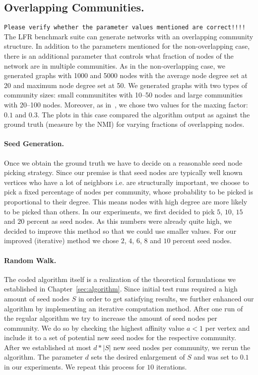 \subsection{Overlapping Communities.}
\texttt{Please verify whether the parameter values mentioned are correct!!!!}
The LFR benchmark suite can generate networks with an overlapping community structure. 
In addition to the parameters mentioned for the non-overlapping case, there is an additional 
parameter that controls what fraction of nodes of the network are in multiple communities. 
As in the non-overlapping case, we generated graphs with 1000 and 5000 nodes with the average
node degree set at 20 and maximum node degree set at 50. We generated graphs with two types 
of community sizes: small communitites with 10--50 nodes and large communities with 20--100 nodes.
Moreover, as in~\cite{LF09}, we chose two values for the maxing factor: $0.1$ and $0.3$. 
The plots in this case compared the algorithm output as against the ground truth (measure by 
the NMI) for varying fractions of overlapping nodes. 

\paragraph{Seed Generation.}
Once we obtain the ground truth we have to decide on a reasonable seed node 
picking strategy. Since our premise is that seed nodes are typically well known vertices 
who have a lot of neighbors i.e. are structurally important, we choose to pick a fixed 
percentage of nodes per community, whose probability to be picked is proportional to their degree. 
This means nodes with high degree are more likely to be picked than others. In our experiments, 
we first decided to pick $5$, $10$, $15$ and $20$ percent as seed nodes. As this numbers were 
already quite high, we decided to improve this method so that we could use smaller values. 
For our improved (iterative) method we chose $2$, $4$, $6$, $8$ and $10$ percent seed nodes.

\paragraph{Random Walk.}
The coded algorithm itself is a realization of the theoretical formulations we 
established in Chapter~\ref{sec:algorithm}. Since initial test runs required a high amount
of seed nodes $S$ in order to get satisfying results, we further enhanced our algorithm by implementing 
an iterative computation method. After one run of the regular algorithm we try to increase the amount of 
seed nodes per community. We do so by checking the highest affinity value $a < 1$ per vertex and include 
it to a set of potential new seed nodes for the respective community. After we established at most 
$d * \left| S \right|$ new seed nodes per community, we rerun the algorithm. The parameter $d$ sets 
the desired enlargement of $S$ and was set to $0.1$ in our experiments. We repeat this process for 
$10$ iterations.

